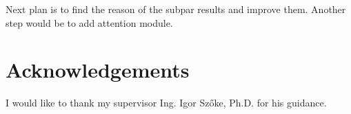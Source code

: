 \documentclass{ExcelAtFIT}
\begin{document}
Next plan is to find the reason of the subpar results and improve them. Another step would be to add attention module.

\section*{Acknowledgements}
I would like to thank my supervisor Ing. Igor Szőke, Ph.D. for his guidance.





\end{document}
